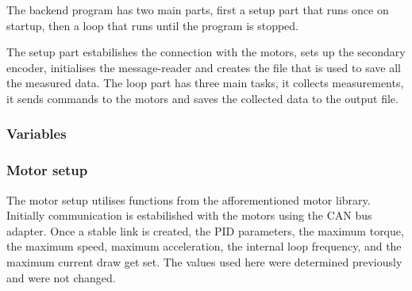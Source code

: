 \documentclass[12pt]{article}
\begin{document}
The backend program has two main parts, first a setup part that runs once on startup, then a loop that runs until the program is stopped.

The setup part estabilishes the connection with the motors, sets up the secondary encoder, initialises the message-reader and creates the file that is used to save all the measured data. The loop part has three main tasks, it collects measurements, it sends commands to the motors and saves the collected data to the output file.  

\subsubsection{Variables}
\subsubsection{Motor setup}
The motor setup utilises functions from the afforementioned motor library. Initially communication is estabilished with the motors using the CAN bus adapter. Once a stable link is created, the PID parameters, the maximum torque, the maximum speed, maximum acceleration, the internal loop frequency, and the maximum current draw get set. The values used here were determined previously and were not changed. 
\end{document}
